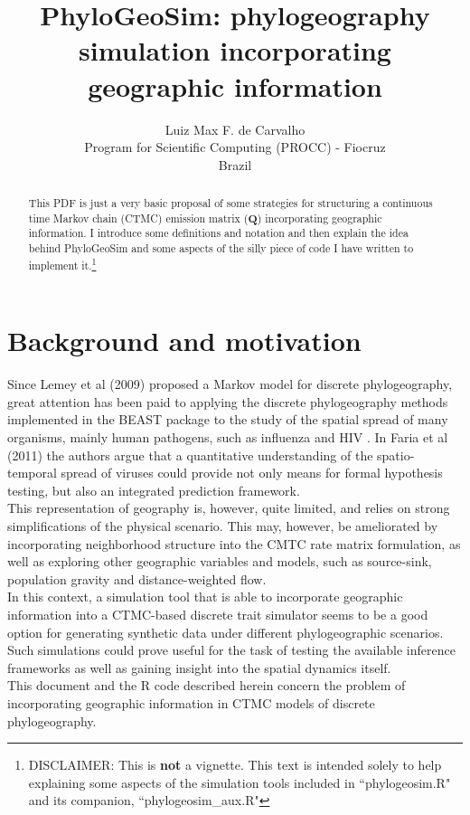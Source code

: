 \documentclass[a4paper,10pt]{article}
\title {PhyloGeoSim: phylogeography simulation incorporating geographic information}
\author{Luiz Max F. de Carvalho\\
Program for Scientific Computing (PROCC) - Fiocruz\\
Brazil}
\begin{document}
\maketitle
\begin{abstract}
This PDF is just a very basic proposal of some strategies for structuring a continuous time Markov chain (CTMC) emission matrix ($\mathbf{Q}$) incorporating geographic information. I introduce some definitions and notation and then explain the idea behind PhyloGeoSim and some aspects of the silly piece of code I have written to implement it.\footnote{DISCLAIMER: This is \textbf{not} a vignette. This text is intended solely to help explaining some aspects of the simulation tools included in ``phylogeosim.R" and its companion, ``phylogeosim\_aux.R"}
\end{abstract}
\section{Background and motivation}
\indent Since Lemey et al (2009) \cite{Lemey2009} proposed a Markov model for discrete phylogeography, great attention has been paid to applying the discrete phylogeography methods implemented in the BEAST package to the study of the spatial spread of many organisms, mainly human pathogens, such as influenza \cite{Nelson2011,Bahl2011} and HIV \cite{Faria2012a,Faria2012b}. In Faria et al (2011) \cite{Faria2011} the authors argue that a quantitative understanding of the spatio-temporal spread of viruses could provide not only means for formal hypothesis testing, but also an integrated prediction framework.\\
\indent This representation of geography is, however, quite limited, and relies on strong simplifications of the physical scenario. This may, however, be ameliorated by incorporating neighborhood structure into the CMTC rate matrix formulation, as well as exploring other geographic variables and models, such as source-sink, population gravity and distance-weighted flow.\\ 
\indent In this context, a simulation tool that is able to  incorporate geographic information into a CTMC-based discrete trait simulator seems to be a good option for generating synthetic data under different phylogeographic scenarios. Such simulations could prove useful for the task of testing the available inference frameworks as well as gaining insight into the spatial dynamics itself.\\ 
\indent This document and the R code described herein concern the problem of incorporating geographic information in CTMC models of discrete phylogeography.\\
\end{document}
